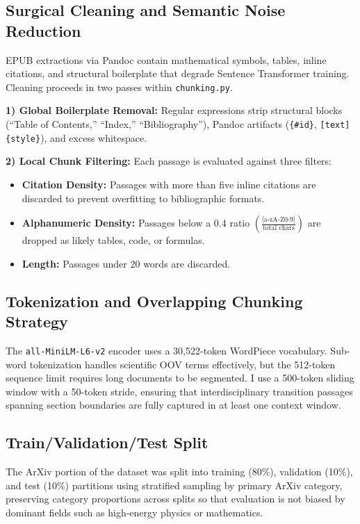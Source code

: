 \documentclass[10pt,journal,compsoc]{IEEEtran}
\newcommand{\TrainSplitPct}{80}
\newcommand{\ValSplitPct}{10}
\newcommand{\TestSplitPct}{10}
\begin{document}
	\subsection{Surgical Cleaning and Semantic Noise Reduction}
	EPUB extractions via Pandoc \cite{pandoc} contain mathematical symbols, tables,
	inline citations, and structural boilerplate that degrade Sentence Transformer
	training. Cleaning proceeds in two passes within \texttt{chunking.py}.
	
	\textbf{1) Global Boilerplate Removal:} Regular expressions strip structural blocks
	(``Table of Contents,'' ``Index,'' ``Bibliography''), Pandoc artifacts
	(\texttt{\{\#id\}}, \texttt{[text]\{style\}}), and excess whitespace.
	
	\textbf{2) Local Chunk Filtering:} Each passage is evaluated against three filters:
	\begin{itemize}
		\item \textbf{Citation Density:} Passages with more than five inline citations
		are discarded to prevent overfitting to bibliographic formats.
		\item \textbf{Alphanumeric Density:} Passages below a 0.4 ratio
		$\left(\frac{\text{[a-zA-Z0-9]}}{\text{total chars}}\right)$
		are dropped as likely tables, code, or formulas.
		\item \textbf{Length:} Passages under 20 words are discarded.
	\end{itemize}
	
	\subsection{Tokenization and Overlapping Chunking Strategy}
	The \texttt{all-MiniLM-L6-v2} encoder uses a 30,522-token WordPiece vocabulary.
	Sub-word tokenization handles scientific OOV terms effectively, but the 512-token
	sequence limit requires long documents to be segmented. I use a 500-token sliding
	window with a 50-token stride, ensuring that interdisciplinary transition passages
	spanning section boundaries are fully captured in at least one context window.
	
	\subsection{Train/Validation/Test Split}
	The ArXiv portion of the dataset was split into training (\TrainSplitPct{}\%),
	validation (\ValSplitPct{}\%), and test (\TestSplitPct{}\%) partitions using
	stratified sampling by primary ArXiv category, preserving category proportions
	across splits so that evaluation is not biased by dominant fields such as
	high-energy physics or mathematics.
	
\end{document}
